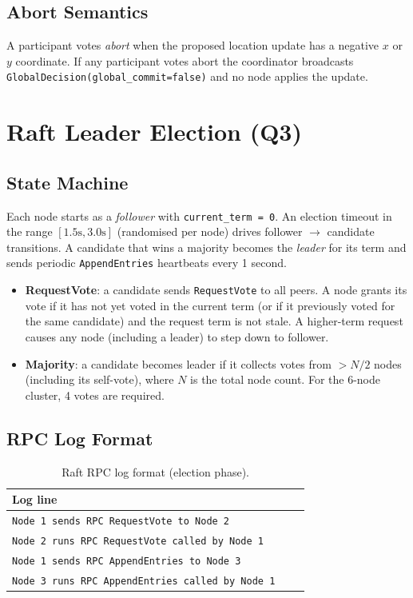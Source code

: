 \documentclass[11pt]{article}
\newcommand{\rpc}[1]{\texttt{#1}}
\begin{document}
\subsection{Abort Semantics}

A participant votes \emph{abort} when the proposed location update has a negative $x$
or $y$ coordinate.  If any participant votes abort the coordinator broadcasts
\rpc{GlobalDecision(global\_commit=false)} and no node applies the update.

\section{Raft Leader Election (Q3)}

\subsection{State Machine}

Each node starts as a \emph{follower} with \texttt{current\_term = 0}.
An election timeout in the range $[1.5\text{s}, 3.0\text{s}]$ (randomised per node)
drives follower $\rightarrow$ candidate transitions.
A candidate that wins a majority becomes the \emph{leader} for its term and sends
periodic \rpc{AppendEntries} heartbeats every 1 second.

\begin{itemize}
  \item \textbf{RequestVote}: a candidate sends \rpc{RequestVote} to all peers.
    A node grants its vote if it has not yet voted in the current term (or if it
    previously voted for the same candidate) and the request term is not stale.
    A higher-term request causes any node (including a leader) to step down to follower.
  \item \textbf{Majority}: a candidate becomes leader if it collects votes from
    $> N/2$ nodes (including its self-vote), where $N$ is the total node count.
    For the 6-node cluster, 4 votes are required.
\end{itemize}

\subsection{RPC Log Format}

\begin{table}[H]
\centering
\caption{Raft RPC log format (election phase).}
\label{tab:raft-log-election}
\begin{tabular}{p{0.92\linewidth}}
\toprule
\textbf{Log line} \\
\midrule
\lstinline|Node 1 sends RPC RequestVote to Node 2| \\
\lstinline|Node 2 runs RPC RequestVote called by Node 1| \\
\lstinline|Node 1 sends RPC AppendEntries to Node 3| \\
\lstinline|Node 3 runs RPC AppendEntries called by Node 1| \\
\bottomrule
\end{tabular}
\end{table}
\end{document}
